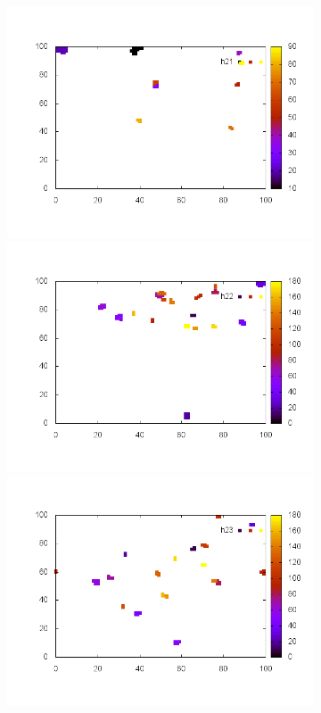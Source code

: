 \documentclass[10pt,a4paper]{article}
\begin{document}
\begin{figure}
\begin{subfigure}[b]{1\textwidth}
\end{subfigure}
\begin{subfigure}[b]{1\textwidth}
\includegraphics[scale=.3]{./img/SCC_Stable3/cut99p/21.png}
\includegraphics[scale=.3]{./img/SCC_Stable3/cut99p/22.png}
\includegraphics[scale=.3]{./img/SCC_Stable3/cut99p/23.png}

\end{subfigure}
\end{figure}
\end{document}
